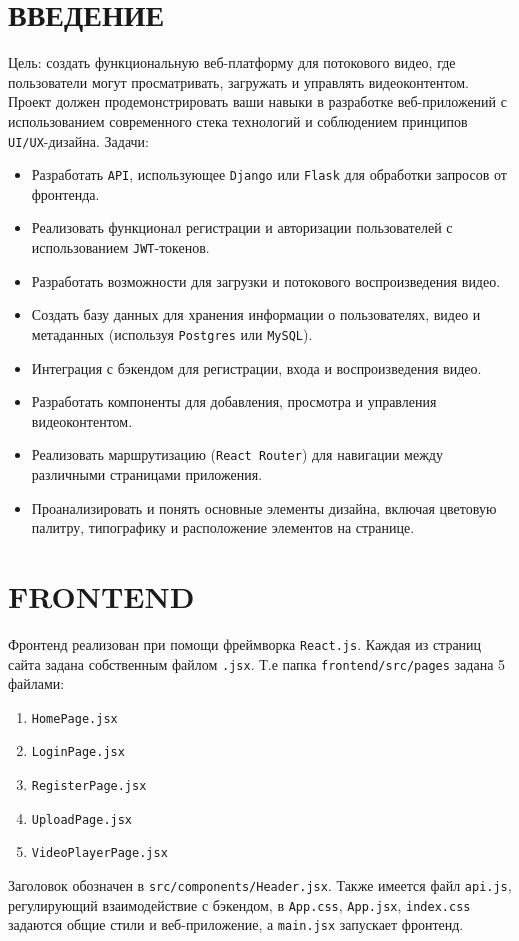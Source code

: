\documentclass[a4paper,14pt,oneside,openany]{memoir}
\begin{document}
\chapter*{ВВЕДЕНИЕ}
Цель: создать функциональную веб-платформу для потокового видео, где пользователи могут просматривать, загружать и управлять видеоконтентом. Проект должен продемонстрировать ваши навыки в разработке веб-приложений с использованием современного стека технологий и соблюдением принципов \texttt{UI/UX}-дизайна.
    Задачи: 
    \begin{itemize}
        \item Разработать \texttt{API}, использующее \texttt{Django} или \texttt{Flask} для обработки запросов от фронтенда.
        \item Реализовать функционал регистрации и авторизации пользователей с использованием \texttt{JWT}-токенов.
        \item Разработать возможности для загрузки и потокового воспроизведения видео.
        \item Создать базу данных для хранения информации о пользователях, видео и метаданных (используя \texttt{Postgres} или \texttt{MySQL}).
        \item Интеграция с бэкендом для регистрации, входа и воспроизведения видео.
        \item Разработать компоненты для добавления, просмотра и управления видеоконтентом.
        \item Реализовать маршрутизацию (\texttt{React Router}) для навигации между различными страницами приложения.
        \item Проанализировать и понять основные элементы дизайна, включая цветовую палитру, типографику и расположение элементов на странице.
    \end{itemize}

\chapter{FRONTEND}
Фронтенд реализован при помощи фреймворка \texttt{React.js}. 
Каждая из страниц сайта задана собственным файлом \texttt{.jsx}. Т.е папка \texttt{frontend/src/pages} задана 5 файлами:
\begin{enumerate}
    \item \texttt{HomePage.jsx}
    \item \texttt{LoginPage.jsx}
    \item \texttt{RegisterPage.jsx}
    \item \texttt{UploadPage.jsx}
    \item \texttt{VideoPlayerPage.jsx}
\end{enumerate}
Заголовок обозначен в \texttt{src/components/Header.jsx}.
Также имеется файл \texttt{api.js}, регулирующий взаимодействие с бэкендом, в \texttt{App.css}, \texttt{App.jsx}, \texttt{index.css} задаются общие стили и веб-приложение, а \texttt{main.jsx} запускает фронтенд.
\end{document}
